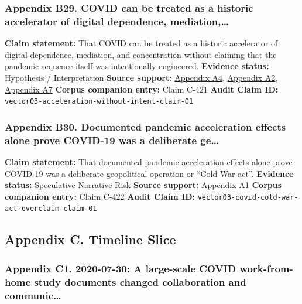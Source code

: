 \documentclass[
  american,
  11pt,
  letterpaper,
]{article}
\begin{document}
\subsubsection{Appendix B29. COVID can be treated as a historic
accelerator of digital dependence,
mediation,\ldots{}}\label{ch-03-appendix-b29-covid-can-be-treated-as-a-historic-accelerator-of-digital-dependence-mediation}

\textbf{Claim statement:} That COVID can be treated as a historic
accelerator of digital dependence, mediation, and concentration without
claiming that the pandemic sequence itself was intentionally engineered.
\textbf{Evidence status:} Hypothesis / Interpretation \textbf{Source
support:}
\hyperref[ch-03-appendix-a4-work-from-home-is-here-to-stay-call-for-flexibility-in-post-pandemic-work-policies]{Appendix
A4},
\hyperref[ch-03-appendix-a2-big-tech-announces-striking-pandemic-gains-as-small-businesses-strain-to-find-their-footing]{Appendix
A2},
\hyperref[ch-03-appendix-a7-what-social-media-told-about-us-in-the-time-of-covid-19-a-scoping-review]{Appendix
A7} \textbf{Corpus companion entry:} Claim C-421 \textbf{Audit Claim
ID:} \texttt{vector03-acceleration-without-intent-claim-01}

\subsubsection{Appendix B30. Documented pandemic acceleration effects
alone prove COVID-19 was a deliberate
ge\ldots{}}\label{ch-03-appendix-b30-documented-pandemic-acceleration-effects-alone-prove-covid-19-was-a-deliberate-ge}

\textbf{Claim statement:} That documented pandemic acceleration effects
alone prove COVID-19 was a deliberate geopolitical operation or ``Cold
War act''. \textbf{Evidence status:} Speculative Narrative Risk
\textbf{Source support:}
\hyperref[ch-03-appendix-a1-report-on-potential-links-between-the-wuhan-institute-of-virology-and-the-origins-of-covid-19]{Appendix
A1} \textbf{Corpus companion entry:} Claim C-422 \textbf{Audit Claim
ID:} \texttt{vector03-covid-cold-war-act-overclaim-claim-01}

\subsection{Appendix C. Timeline
Slice}\label{appendix-c.-timeline-slice-3}

\subsubsection{Appendix C1. 2020-07-30: A large-scale COVID
work-from-home study documents changed collaboration and
communic\ldots{}}\label{ch-03-appendix-c1-2020-07-30-a-large-scale-covid-work-from-home-study-documents-changed-collaboration-and-communication-patterns}
\end{document}
